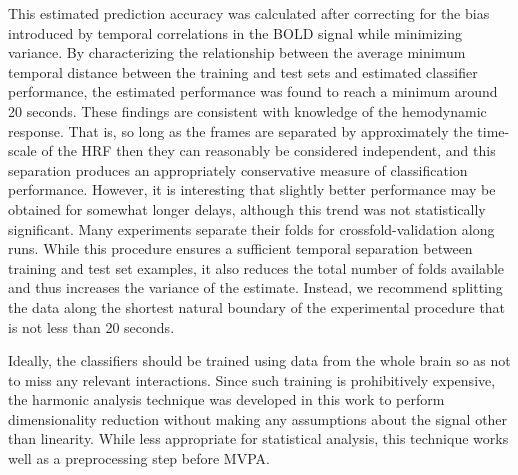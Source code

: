 \documentclass[review,1p,authoryear]{elsarticle}
\begin{document}
This estimated prediction accuracy was calculated after correcting for the bias introduced by temporal correlations in the BOLD signal while minimizing variance.
By characterizing the relationship between the average minimum temporal distance between the training and test sets and estimated classifier performance, the estimated performance was found to reach a minimum around 20 seconds.
These findings are consistent with knowledge of the hemodynamic response.
That is, so long as the frames are separated by approximately the time-scale of the HRF then they can reasonably be considered independent, and this separation produces an appropriately conservative measure of classification performance. 
However, it is interesting that slightly better performance may be obtained for somewhat longer delays, although this trend was not statistically significant.
Many experiments separate their folds for crossfold-validation along runs.
While this procedure ensures a sufficient temporal separation between training and test set examples, it also reduces the total number of folds available and thus increases the variance of the estimate.
Instead, we recommend splitting the data along the shortest natural boundary of the experimental procedure that is not less than 20 seconds.

Ideally, the classifiers should be trained using data from the whole brain so as not to miss any relevant interactions.
Since such training is prohibitively expensive, the harmonic analysis technique was developed in this work to perform dimensionality reduction without making any assumptions about the signal other than linearity.
While less appropriate for statistical analysis, this technique works well as a preprocessing step before MVPA.
\end{document}
